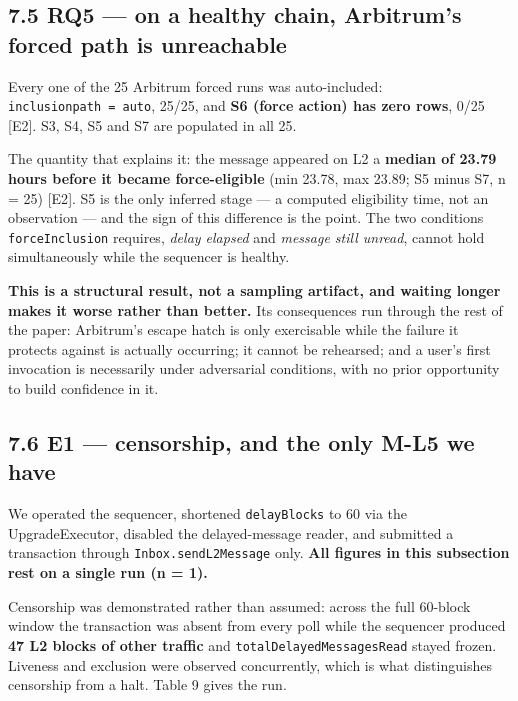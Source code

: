 \documentclass[conference]{IEEEtran}
\renewcommand{\_}{\textunderscore\allowbreak}
\begin{document}
\subsection{7.5 RQ5 --- on a healthy chain, Arbitrum's forced path is
unreachable}\label{rq5-on-a-healthy-chain-arbitrums-forced-path-is-unreachable}

Every one of the 25 Arbitrum forced runs was auto-included:
\texttt{inclusion\_path\ =\ auto}, 25/25, and \textbf{S6 (force action)
has zero rows}, 0/25 {[}E2{]}. S3, S4, S5 and S7 are populated in all
25.

The quantity that explains it: the message appeared on L2 a
\textbf{median of 23.79 hours before it became force-eligible} (min
23.78, max 23.89; S5 minus S7, n = 25) {[}E2{]}. S5 is the only inferred
stage --- a computed eligibility time, not an observation --- and the
sign of this difference is the point. The two conditions
\texttt{forceInclusion} requires, \emph{delay elapsed} and \emph{message
still unread}, cannot hold simultaneously while the sequencer is
healthy.

\textbf{This is a structural result, not a sampling artifact, and
waiting longer makes it worse rather than better.} Its consequences run
through the rest of the paper: Arbitrum's escape hatch is only
exercisable while the failure it protects against is actually occurring;
it cannot be rehearsed; and a user's first invocation is necessarily
under adversarial conditions, with no prior opportunity to build
confidence in it.

\subsection{7.6 E1 --- censorship, and the only M-L5 we
have}\label{e1-censorship-and-the-only-m-l5-we-have}

We operated the sequencer, shortened \texttt{delayBlocks} to 60 via the
UpgradeExecutor, disabled the delayed-message reader, and submitted a
transaction through \texttt{Inbox.sendL2Message} only. \textbf{All
figures in this subsection rest on a single run (n = 1).}

Censorship was demonstrated rather than assumed: across the full
60-block window the transaction was absent from every poll while the
sequencer produced \textbf{47 L2 blocks of other traffic} and
\texttt{totalDelayedMessagesRead} stayed frozen. Liveness and exclusion
were observed concurrently, which is what distinguishes censorship from
a halt. Table 9 gives the run.
\end{document}
